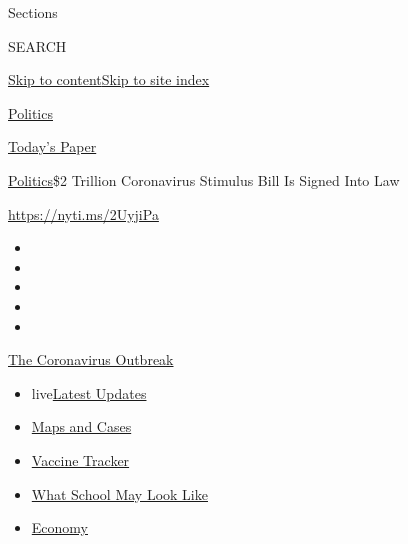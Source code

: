 Sections

SEARCH

\protect\hyperlink{site-content}{Skip to
content}\protect\hyperlink{site-index}{Skip to site index}

\href{https://www.nytimes.com/section/politics}{Politics}

\href{https://myaccount.nytimes.com/auth/login?response_type=cookie\&client_id=vi}{}

\href{https://www.nytimes.com/section/todayspaper}{Today's Paper}

\href{/section/politics}{Politics}\textbar{}\$2 Trillion Coronavirus
Stimulus Bill Is Signed Into Law

\url{https://nyti.ms/2UyjiPa}

\begin{itemize}
\item
\item
\item
\item
\item
\end{itemize}

\href{https://www.nytimes.com/news-event/coronavirus?action=click\&pgtype=Article\&state=default\&region=TOP_BANNER\&context=storylines_menu}{The
Coronavirus Outbreak}

\begin{itemize}
\tightlist
\item
  live\href{https://www.nytimes.com/2020/08/01/world/coronavirus-covid-19.html?action=click\&pgtype=Article\&state=default\&region=TOP_BANNER\&context=storylines_menu}{Latest
  Updates}
\item
  \href{https://www.nytimes.com/interactive/2020/us/coronavirus-us-cases.html?action=click\&pgtype=Article\&state=default\&region=TOP_BANNER\&context=storylines_menu}{Maps
  and Cases}
\item
  \href{https://www.nytimes.com/interactive/2020/science/coronavirus-vaccine-tracker.html?action=click\&pgtype=Article\&state=default\&region=TOP_BANNER\&context=storylines_menu}{Vaccine
  Tracker}
\item
  \href{https://www.nytimes.com/interactive/2020/07/29/us/schools-reopening-coronavirus.html?action=click\&pgtype=Article\&state=default\&region=TOP_BANNER\&context=storylines_menu}{What
  School May Look Like}
\item
  \href{https://www.nytimes.com/live/2020/07/31/business/stock-market-today-coronavirus?action=click\&pgtype=Article\&state=default\&region=TOP_BANNER\&context=storylines_menu}{Economy}
\end{itemize}

